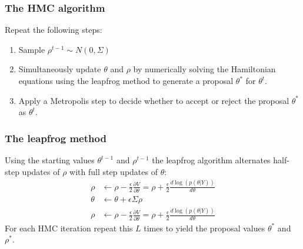 \documentclass{beamer}
\begin{document}
\begin{frame}
  \frametitle{The HMC algorithm}
  
Repeat the following steps:
  \begin{enumerate}
  \item Sample  $\rho^{t-1} \sim N\left(0, \Sigma\right)$
\item Simultaneously update $\theta$ and $\rho$ by numerically solving
  the Hamiltonian equations using the leapfrog method to generate a
  proposal $\theta^*$ for $\theta^t$.
\item Apply a Metropolis step to decide whether to
  accept or reject the proposal $\theta^*$ as $\theta^t$.
  \end{enumerate}

\end{frame}

\begin{frame}
  \frametitle{The leapfrog method}

Using the starting values $\theta^{t-1}$ and $\rho^{t-1}$ the leapfrog
algorithm alternates half-step updates of $\rho$ with full step
updates of $\theta$:
\begin{align*}
  \rho &\leftarrow \rho - \frac{\epsilon}{2} \frac{\partial V}{\partial
  \theta} = \rho + \frac{\epsilon}{2} \frac{d\log\left(p\left(\theta |
         Y\right)\right)}{d\theta} \\
\theta &\leftarrow \theta + \epsilon \Sigma \rho \\
  \rho &\leftarrow \rho - \frac{\epsilon}{2} \frac{\partial V}{\partial
  \theta} = \rho + \frac{\epsilon}{2} \frac{d\log\left(p\left(\theta |
         Y\right)\right)}{d\theta} 
\end{align*}
For each HMC iteration repeat this $L$ times to yield the proposal
values $\theta^*$ and $\rho^*$.

\end{frame}
\end{document}
